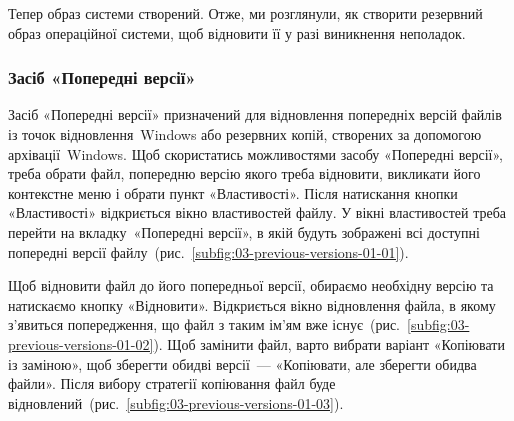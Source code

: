\documentclass[
	a4paper,
	oneside,
	BCOR = 10mm,
	DIV = 12,
	12pt,
	headings = normal,
]{scrartcl}
\begin{document}
				Тепер образ системи створений. Отже, ми розглянули, як створити резервний образ операційної системи, щоб відновити її у разі виникнення неполадок.

			\subsubsection{Засіб «Попередні версії»}
				Засіб «Попередні версії» призначений для відновлення попередніх версій файлів із точок відновлення~\textenglish{Windows} або резервних копій, створених за допомогою архівації~\textenglish{Windows}. Щоб скористатись можливостями засобу «Попередні версії», треба обрати файл, попередню версію якого треба відновити, викликати його контекстне меню і обрати пункт «Властивості». Після натискання кнопки «Властивості» відкриється вікно властивостей файлу. У вікні властивостей треба перейти на вкладку «Попередні версії», в якій будуть зображені всі доступні попередні версії файлу~(рис.~\ref{subfig:03-previous-versions-01-01}).

				Щоб відновити файл до його попередньої версії, обираємо необхідну версію та натискаємо кнопку «Відновити». Відкриється вікно відновлення файла, в якому з'явиться попередження, що файл з таким ім'ям вже існує~(рис.~\ref{subfig:03-previous-versions-01-02}). Щоб замінити файл, варто вибрати варіант «Копіювати із заміною», щоб зберегти обидві версії~— «Копіювати, але зберегти обидва файли». Після вибору стратегії копіювання файл буде відновлений~(рис.~\ref{subfig:03-previous-versions-01-03}).
\end{document}
